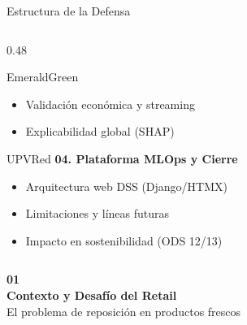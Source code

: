\documentclass[aspectratio=169, 10pt]{beamer}
\begin{document}
\begin{frame}{Estructura de la Defensa}
\begin{columns}[T]
\begin{column}{0.48\textwidth}
\begin{metriccard}{EmeraldGreen}
\begin{itemize}
          \item Validación económica y streaming
          \item Explicabilidad global (SHAP)
        \end{itemize}
      \end{metriccard}
      \vspace{0.2cm}
      \begin{metriccard}{UPVRed}
        \textbf{\textcolor{UPVRed}{04. Plataforma MLOps y Cierre}}
        \begin{itemize}\small
          \item Arquitectura web DSS (Django/HTMX)
          \item Limitaciones y líneas futuras
          \item Impacto en sostenibilidad (ODS 12/13)
        \end{itemize}
      \end{metriccard}
    \end{column}
  \end{columns}
\end{frame}

\begin{frame}[standout]
  \Huge \textbf{01} \\[0.4cm]
  \Large \textbf{Contexto y Desafío del Retail} \\[0.2cm]
  \normalsize El problema de reposición en productos frescos
\end{frame}
\end{document}

